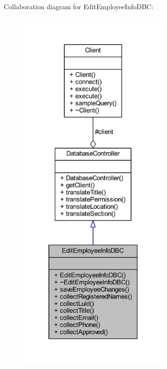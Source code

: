 Collaboration diagram for Edit\+Employee\+Info\+D\+B\+C\+:
\nopagebreak
\begin{figure}[H]
\begin{center}
\leavevmode
\includegraphics[width=217pt]{class_edit_employee_info_d_b_c__coll__graph}
\end{center}
\end{figure}
